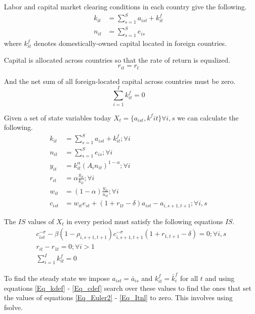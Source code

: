 \documentclass[letterpaper,12pt]{article}
\theoremstyle{definition}
\numberwithin{equation}{section}
\begin{document}
\begin{spacing}{1.5}
	Labor and capital market clearing conditions in each country give the following.
	\begin{align}
		k_{it} & = \sum_{s=1}^S a_{ist} + k_{it}^f\\
		n_{it} & = \sum_{s=1}^S e_{is}
	\end{align}
	where $k_{it}^f$ denotes domestically-owned capital located in foreign countries.

	Capital is allocated across countries so that the rate of return is equalized.
	\begin{equation} \label{Eq_requal}
		r_{it} = r_t
	\end{equation}

	And the net sum of all foreign-located capital across countries must be zero.
	\begin{equation}
		\sum_{i=1}^I k^f_{it} = 0
	\end{equation}

	Given a set of state variables today $X_t = \{a_{ist},k^f{it}\} \forall i,s$ we can calculate the following.
	\begin{align}
		k_{it} & = \sum_{s=1}^S a_{ist} + k_{it}^f; \forall i \label{Eq_kdef}\\
		n_{it} & = \sum_{s=1}^S e_{is}; \forall i \\
		y_{it} & = k_{it}^\alpha \left( A_{i} n_{it} \right)^{1-\alpha} ; \forall i \\
		r_{it} & = \alpha \frac{y_{it}}{k_{it}}; \forall i \label{Eq_rdef}\\
		w_{it} & = (1-\alpha) \frac{y_{it}}{n_{it}}; \forall i \label{Eq_wdef}\\		
    	c_{ist} & = w_{it} e_{st} + (1+r_{1t}-\delta)a_{ist} - a_{i,s+1,t+1} ; \forall i,s \label{Eq_cdef}
	\end{align}

	The $IS$ values of $X_t$ in every period must satisfy the following equations $IS$.
	\begin{align}
		& c_{ist}^{-\sigma} - \beta (1-\rho_{i,s+1,t+1}) c_{i,s+1,t+1}^{-\sigma}(1+r_{1,t+1}-\delta) = 0; \forall i,s \label{Eq_Euler2}\\ 
		& r_{it} - r_{1t} = 0; \forall i>1 \\
		& \sum_{i=1}^I k^f_{it} = 0 \label{Eq_Itnl}
	\end{align}

	To find the steady state we impose $a_{ist} = \bar a_{is}$ and $k^f_{it}=\bar k^f_i$ for all $t$ and using equations \eqref{Eq_kdef} - \eqref{Eq_cdef} search over these values to find the ones that set the values of equations \eqref{Eq_Euler2} - \eqref{Eq_Itnl} to zero.  This involves using fsolve.


\end{spacing}
\end{document}
